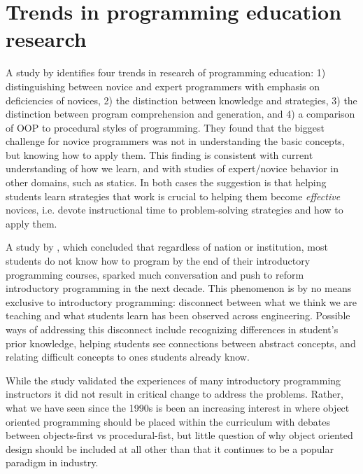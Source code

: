 \documentclass[12pt]{article}
\begin{document}
\section{Trends in programming education research}
A \citeyear{robins_learning_2003} study by
\citeauthor{robins_learning_2003} identifies four trends in research
of programming education: 1) distinguishing between novice and expert
programmers with emphasis on deficiencies of novices, 2) the
distinction between knowledge and strategies, 3) the distinction
between program comprehension and generation, and 4) a comparison of
OOP to procedural styles of
programming\autocite{robins_learning_2003}. They found that the
biggest challenge for novice programmers was not in understanding the
basic concepts, but knowing how to apply them. This finding is
consistent with current understanding of how we
learn\autocite{bransford_how_2000,ambrose_chapter_2010}, and with
studies of expert/novice behavior in other domains, such as
statics\autocite{litzinger_cognitive_2010}. In both cases the
suggestion is that helping students learn strategies that work is
crucial to helping them become \emph{effective} novices, i.e. devote
instructional time to problem-solving strategies and how to apply
them.

A \citeyear{mccracken_multinational_2001} study by
\citeauthor{mccracken_multinational_2001}\autocite{mccracken_multinational_2001},
which concluded that regardless of nation or institution, most
students do not know how to program by the end of their introductory
programming courses, sparked much conversation and push to reform
introductory programming in the next decade. This phenomenon is by no
means exclusive to introductory programming: disconnect between what
we think we are teaching and what students learn has been observed
across
engineering\autocite{streveler_learning_2008,flynn_engineering_2014}. Possible
ways of addressing this disconnect include recognizing differences in
student's prior knowledge, helping students see connections between
abstract concepts, and relating difficult concepts to ones students
already know\autocite{streveler_learning_2008,slotta_helping_2006}.

While the \citeauthor{mccracken_multinational_2001} study validated the
experiences of many introductory programming instructors it did not
result in critical change to address the problems. Rather, what we
have seen since the 1990s is been an increasing interest in where
object oriented programming should be placed within the curriculum
with debates between objects-first vs procedural-fist, but little
question of why object oriented design should be included at all other
than that it continues to be a popular paradigm in industry.
\end{document}
